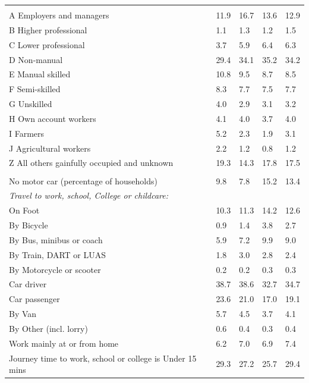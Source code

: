 \documentclass{article}
\begin{document}
\begin{table}[h]
\begin{tabular}{KTTTT}
\hline
    \\ 
    \hline
A Employers and managers & 11.9& 16.7& 13.6& 12.9\\
B Higher professional & 1.1& 1.3& 1.2& 1.5\\
C Lower professional & 3.7& 5.9& 6.4& 6.3\\
D Non-manual & 29.4& 34.1& 35.2& 34.2\\
E Manual skilled & 10.8&  9.5&  8.7&  8.5\\
F Semi-skilled & 8.3& 7.7& 7.5& 7.7\\
G Unskilled & 4.0& 2.9& 3.1& 3.2\\
H Own account workers & 4.1& 4.0& 3.7& 4.0\\
I Farmers & 5.2& 2.3& 1.9& 3.1\\
J Agricultural workers & 2.2& 1.2& 0.8& 1.2\\
Z All others gainfully occupied and unknown & 19.3& 14.3& 17.8& 17.5\\
\hline
{}\hline
    \\ 
    \hline
No motor car (percentage of households) &  9.8&  7.8& 15.2& 
13.4\\
    \hline 
\emph{Travel to work, school, College or childcare:} & & & \\
\quad On Foot & 10.3& 11.3& 14.2& 12.6\\ 
\quad By Bicycle & 0.9& 1.4& 3.8& 2.7\\ 
\quad By Bus, minibus or coach & 5.9& 7.2& 9.9& 9.0\\
\quad By Train, DART or LUAS & 1.8& 3.0& 2.8& 2.4\\
\quad By Motorcycle or scooter & 0.2& 0.2& 0.3& 0.3\\
\quad Car driver & 38.7 & 38.6& 32.7& 34.7\\
\quad Car passenger & 23.6& 21.0& 17.0& 19.1\\
\quad By Van & 5.7& 4.5& 3.7& 4.1\\
\quad By Other (incl. lorry) & 0.6& 0.4& 0.3& 0.4\\
    \hline
Work mainly at or from home & 6.2& 7.0& 6.9& 7.4\\
Journey time to work, school or college is Under 15 mins & 29.3& 27.2& 25.7& 29.4\\

\end{tabular}
\end{table}
\end{document}
